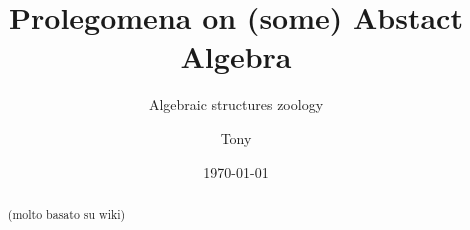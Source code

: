 \documentclass[a4paper,12pt]{scrartcl}    %
\begin{document}
	\title{Prolegomena on (some) Abstact Algebra}
	\subtitle{Algebraic structures zoology}
	\author{Tony}
	\date{\today}
\maketitle

\begin{abstract}
	(molto basato su wiki)

\end{abstract}

\tableofcontents

\newpage



\begin{landscape}
    \thispagestyle{empty}
    \noindent

	\begin{minipage}[t][]{0.30 \linewidth}

\end{minipage}
\end{landscape}
\end{document}
